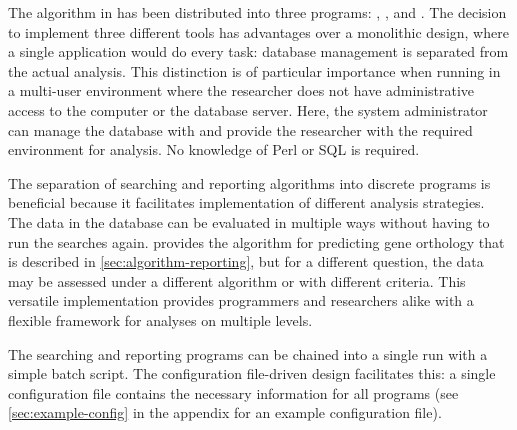 The algorithm in \pname has been distributed into three programs:
, , and
. The decision to implement three different tools
has advantages over a monolithic design, where a single application would do
every task: database management is separated from the actual analysis. This
distinction is of particular importance when running \pname in a multi-user
environment where the researcher does not have administrative access to the
computer or the database server. Here, the system administrator can manage the
database with  and provide the researcher with the
required environment for analysis. No knowledge of Perl or SQL is required.

The separation of searching and reporting algorithms into discrete programs is
beneficial because it facilitates implementation of different analysis
strategies. The data in the database can be evaluated in multiple ways without
having to run the searches again.  provides the
algorithm for predicting gene orthology that is described in
\autoref{sec:algorithm-reporting}, but for a different question, the data may be
assessed under a different algorithm or with different criteria. This versatile
implementation provides programmers and researchers alike with a flexible
framework for analyses on multiple levels. 

The searching and reporting programs can be chained into a single run with a
simple batch script. The configuration file-driven design facilitates this: a
single configuration file contains the necessary information for all \pname
programs (see \autoref{sec:example-config} in the appendix for an example
configuration file).

